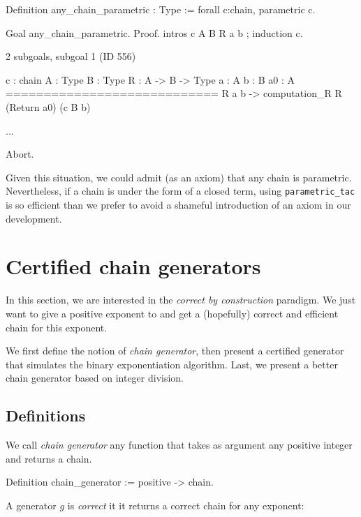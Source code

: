  
\begin{Coqbad}
Definition any_chain_parametric : Type :=
 forall c:chain, parametric c.

Goal any_chain_parametric.
Proof.
intros c A B R a b ; induction c.
\end{Coqbad}

\begin{Coqanswer}
 2 subgoals, subgoal 1 (ID 556)
  
  c : chain
  A : Type
  B : Type
  R : A -> B -> Type
  a : A
  b : B
  a0 : A
  ============================
   R a b -> computation_R R (Return a0) (c B b)

...
\end{Coqanswer}


\begin{Coqbad}
Abort.
\end{Coqbad}


Given this situation, we could  admit (as an axiom) that 
any chain is parametric. Nevertheless, if a chain is under the form of a 
closed term, using \texttt{parametric\_tac} is so efficient than we prefer to 
 avoid
a shameful introduction of an axiom in our development.

\section{Certified chain generators}
\label{chain-generation}

In this section, we are interested in the \emph{correct by construction} paradigm.
We just want to give a positive exponent to \coq{} and get a (hopefully)  correct and  efficient chain for this exponent.

We first define the notion of \emph{chain generator}, then present a certified generator that simulates the binary exponentiation algorithm. Last, we present a better chain generator based on integer division.


\subsection{Definitions}

We call \emph{chain generator} any function that takes as argument 
any positive integer and returns a chain. 

\begin{Coqsrc}
Definition chain_generator := positive -> chain.  
\end{Coqsrc}

A generator $g$  is \emph{correct} it it returns a correct chain
for any exponent:

